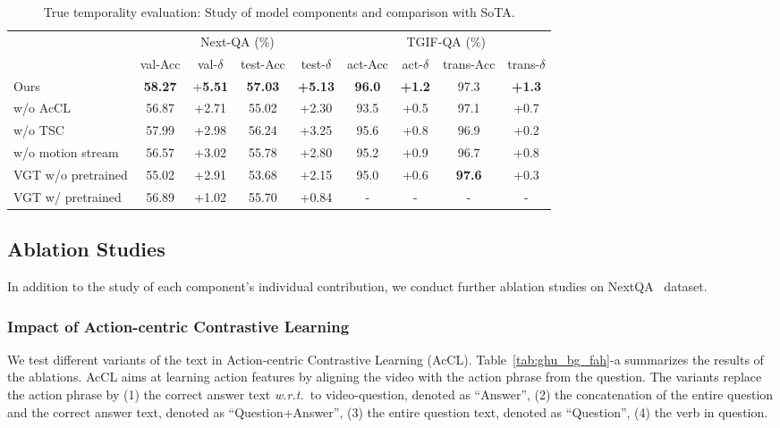 \documentclass[sigconf]{acmart}
\newcommand{\wrt}{\emph{w.r.t.~}}
\begin{document}
\begin{table}[t]
\centering
\scriptsize
\setlength{\tabcolsep}{0.6mm}
\begin{tabular}{l|cccc|cccc}
\hline
  \multirow{2}{*}{} & \multicolumn{4}{c|}{Next-QA (\%)} & \multicolumn{4}{c}{TGIF-QA (\%)} \\
  \cline{2-9}
   & val-Acc  & val-$\delta$ & test-Acc  & test-$\delta$   &act-Acc &act-$\delta$   &trans-Acc &trans-$\delta$ \\ \hline
Ours   & \textbf{58.27} &  +\textbf{5.51} & \textbf{57.03} &  \textbf{+5.13} & \textbf{96.0} & \textbf{+1.2} & 97.3 & \textbf{+1.3}    \\  w/o AcCL   & 56.87 & +2.71 & 55.02 & +2.30   & 93.5  & +0.5  & 97.1  &+0.7 \\  
w/o TSC    & 57.99  & +2.98 & 56.24  &+3.25  & 95.6 & +0.8 & 96.9  &+0.2   \\

w/o motion stream   & 56.57 & +3.02  &55.78  &+2.80  & 95.2 & +0.9 & 96.7 & +0.8   \\ 
VGT w/o pretrained & 55.02 & +2.91   &53.68  & +2.15  & 95.0 & +0.6& \textbf{97.6} & +0.3 \\  
VGT w/ pretrained  &56.89  & +1.02  & 55.70 & +0.84  &- &- &- &- \\  \hline
\end{tabular}


\caption{True temporality evaluation: Study of model components and comparison with SoTA.}
\label{tab:re_as}
\end{table} 

\subsection{Ablation Studies}
In addition to the study of each component's individual contribution, we conduct further ablation studies on NextQA~\cite{xiao2021next} dataset. 

\subsubsection{Impact of Action-centric Contrastive Learning}

We test different variants of the text in Action-centric Contrastive Learning (AcCL). Table~\ref{tab:ghu_bg_fah}-a summarizes the results of the ablations. AcCL aims at learning action features by aligning the video with the action phrase from the question. The variants replace the action phrase by (1) the correct answer text \wrt to video-question, denoted as ``Answer'', (2) the concatenation of the entire question and the correct answer text, denoted as ``Question+Answer'', (3) the entire question text, denoted as ``Question'', (4) the verb in question.
\end{document}
